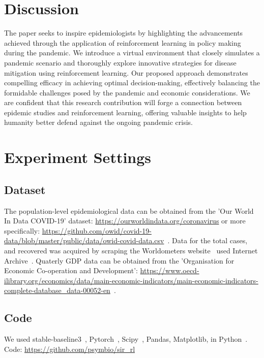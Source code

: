 \documentclass[tikz,fleqn,12pt]{wlscirep}
\begin{document}
\section{Discussion}
The paper seeks to inspire epidemiologists by highlighting the advancements achieved through the application of reinforcement learning in policy making during the pandemic. We introduce a virtual environment that closely simulates a pandemic scenario and thoroughly explore innovative strategies for disease mitigation using reinforcement learning. Our proposed approach demonstrates compelling efficacy in achieving optimal decision-making, effectively balancing the formidable challenges posed by the pandemic and economic considerations. We are confident that this research contribution will forge a connection between epidemic studies and reinforcement learning, offering valuable insights to help humanity better defend against the ongoing pandemic crisis.

\section{Experiment Settings}
\subsection{Dataset}
The population-level epidemiological data can be obtained from the 'Our World In Data COVID-19' dataset: \url{https://ourworldindata.org/coronavirus} or more specifically: \url{https://github.com/owid/covid-19-data/blob/master/public/data/owid-covid-data.csv}~\cite{owidcoronavirus}. Data for the total cases, and recovered was acquired by scraping the Worldometers website~\cite{WorldometerCorona} used Internet Archive~\cite{InternetArchive}. Quaterly GDP data can be obtained from the 'Organisation for Economic Co-operation and Development': \url{https://www.oecd-ilibrary.org/economics/data/main-economic-indicators/main-economic-indicators-complete-database_data-00052-en}~\cite{economic_indicators_data}.

\subsection{Code}
We used stable-baseline3~\cite{JMLR:v22:20-1364}, Pytorch~\cite{paszke2019pytorch}, Scipy~\cite{Virtanen_2020}, Pandas, Matplotlib, in Python~\cite{ScientificPython}.
Code: \url{https://github.com/psymbio/sir_rl}
% 

\end{document}
